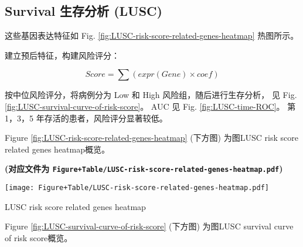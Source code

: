 \documentclass[
]{article}
\begin{document}
\begin{center}\vspace{1.5cm}\end{center}

\hypertarget{survival-ux751fux5b58ux5206ux6790-lusc}{%
\subsection{Survival 生存分析 (LUSC)}\label{survival-ux751fux5b58ux5206ux6790-lusc}}

这些基因表达特征如 Fig. \ref{fig:LUSC-risk-score-related-genes-heatmap} 热图所示。

建立预后特征，构建风险评分：

\[
Score = \sum(expr(Gene) \times coef)
\]

按中位风险评分，将病例分为 Low 和 High 风险组，随后进行生存分析，
见 Fig. \ref{fig:LUSC-survival-curve-of-risk-score}。
AUC 见 Fig. \ref{fig:LUSC-time-ROC}。
第 1，3，5 年存活的患者，风险评分显著较低。

\begin{center}\vspace{1.5cm}\end{center}

Figure \ref{fig:LUSC-risk-score-related-genes-heatmap} (下方图) 为图LUSC risk score related genes heatmap概览。

\textbf{(对应文件为 \texttt{Figure+Table/LUSC-risk-score-related-genes-heatmap.pdf})}

\def\@captype{figure}
\begin{center}
\texttt{[image: Figure+Table/LUSC-risk-score-related-genes-heatmap.pdf]}
\caption{LUSC risk score related genes heatmap}\label{fig:LUSC-risk-score-related-genes-heatmap}
\end{center}

\begin{center}\vspace{1.5cm}\end{center}

\begin{center}\vspace{1.5cm}\end{center}

Figure \ref{fig:LUSC-survival-curve-of-risk-score} (下方图) 为图LUSC survival curve of risk score概览。
\end{document}
